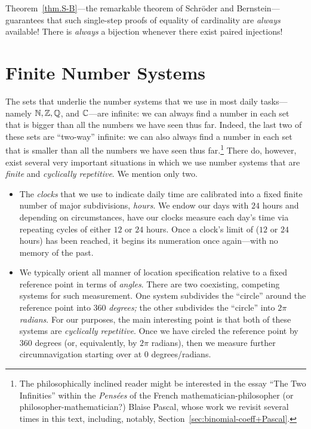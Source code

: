 \medskip

Theorem~\ref{thm.S-B}---the remarkable theorem of Schr\"{o}der and Bernstein---guarantees that such single-step proofs of equality of cardinality are {\em always} available!  There is {\em always} a bijection whenever there exist paired injections!

\section{Finite Number Systems}
\label{sec:congruences+modular}

The sets that underlie the number systems that we use in most daily tasks---namely $\mathbb{N}, \mathbb{Z}, \mathbb{Q}$, and $\mathbb{C}$---are infinite: we can always find a number in each set that is bigger than all the numbers we have seen thus far.  Indeed, the last two of these sets are ``two-way'' infinite: we can also always find a number in each set that is smaller than all the numbers we have seen thus
far.\footnote{\label{foot:Pascal}The philosophically inclined reader might be interested in the essay ``The Two Infinities'' within the {\it Pens\'{e}es} of the French mathematician-philosopher (or
philosopher-mathematician?) Blaise Pascal, whose work we revisit several times in this text, including, notably, Section~\ref{sec:binomial-coeff+Pascal}.} There do, however, exist several very important situations in which we use number systems that are {\em finite} and {\em cyclically repetitive}.  We mention only two.
\begin{itemize}
\item
The {\em clocks} that we use to indicate daily time are calibrated into a fixed finite number of major subdivisions, {\em hours}.  We endow our days with $24$ hours and depending on circumstances, have our clocks measure each day's time via repeating cycles of either $12$ or $24$ hours.  Once a clock's limit of ($12$ or $24$ hours) has been reached, it begins its numeration once again---with no memory of the past.

\item
We typically orient all manner of location specification relative to a fixed reference point in terms of {\em angles}.  There are two coexisting, competing systems for such measurement.  One system
subdivides the ``circle'' around the reference point into $360$ {\em degrees;} the other subdivides the ``circle'' into $2 \pi$ {\em radians}.  For our purposes, the main interesting point is that both of these systems are {\em cyclically repetitive}.  Once we have circled the reference point by $360$ degrees (or, equivalently, by $2 \pi$ radians), then we measure further circumnavigation starting over at $0$ degrees/radians.
\end{itemize}


